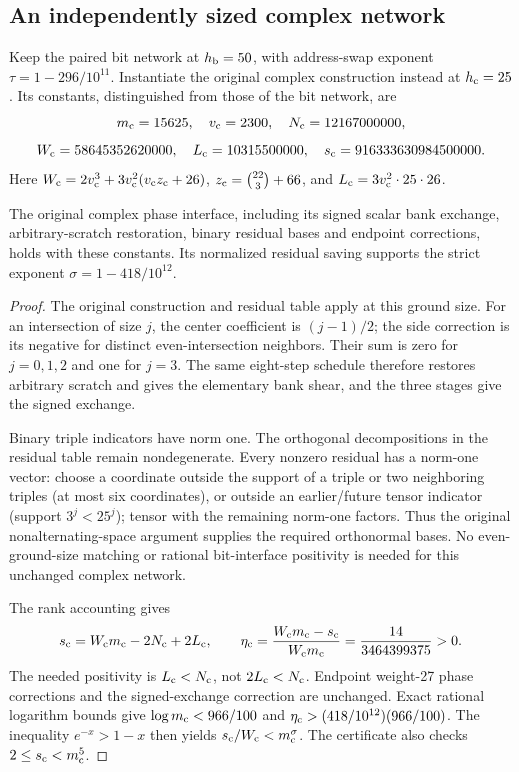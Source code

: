 \subsection{An independently sized complex network}
\label{sec:independent-complex}
Keep the paired bit network at $h_{\rm b}=50$, with address-swap exponent
$\tau=1-296/10^{11}$. Instantiate the original complex construction instead
at $h_{\rm c}=25$. Its constants, distinguished from those of the bit
network, are
\[
 m_{\rm c}=15625,\quad v_{\rm c}=2300,\quad N_{\rm c}=12167000000,
\]
\[
 W_{\rm c}=58645352620000,\quad L_{\rm c}=10315500000,\quad
 s_{\rm c}=916333630984500000.
\]
Here $W_{\rm c}=2v_{\rm c}^3+3v_{\rm c}^2(v_{\rm c}z_{\rm c}+26)$,
$z_{\rm c}=\binom{22}{3}+66$, and $L_{\rm c}=3v_{\rm c}^2\cdot25\cdot26$.

\begin{proposition}\label{prop:compact-complex-interface}
The original complex phase interface, including its signed scalar bank
exchange, arbitrary-scratch restoration, binary residual bases and endpoint
corrections, holds with these constants. Its normalized residual saving
supports the strict exponent $\sigma=1-418/10^{12}$.
\end{proposition}
\begin{proof}
The original construction and residual table apply at this ground size.
For an intersection of size $j$, the center coefficient is $(j-1)/2$; the
side correction is its negative for distinct even-intersection neighbors.
Their sum is zero for $j=0,1,2$ and one for $j=3$. The same eight-step
schedule therefore restores arbitrary scratch and gives the elementary bank
shear, and the three stages give the signed exchange.

Binary triple indicators have norm one. The orthogonal decompositions in
the residual table remain nondegenerate. Every nonzero residual has a
norm-one vector: choose a coordinate outside the support of a triple or two
neighboring triples (at most six coordinates), or outside an earlier/future
tensor indicator (support $3^j<25^j$); tensor with the remaining norm-one
factors. Thus the original nonalternating-space argument supplies the required
orthonormal bases. No even-ground-size matching or rational bit-interface
positivity is needed for this unchanged complex network.

The rank accounting gives
\[
 s_{\rm c}=W_{\rm c}m_{\rm c}-2N_{\rm c}+2L_{\rm c},\qquad
 \eta_{\rm c}=\frac{W_{\rm c}m_{\rm c}-s_{\rm c}}{W_{\rm c}m_{\rm c}}
             =\frac{14}{3464399375}>0.
\]
The needed positivity is $L_{\rm c}<N_{\rm c}$, not
$2L_{\rm c}<N_{\rm c}$. Endpoint weight-27 phase corrections and the
signed-exchange correction are unchanged. Exact rational logarithm bounds
give $\log m_{\rm c}<966/100$ and
$\eta_{\rm c}>(418/10^{12})(966/100)$. The inequality
$e^{-x}>1-x$ then yields $s_{\rm c}/W_{\rm c}<m_{\rm c}^{\sigma}$.
The certificate also checks $2\le s_{\rm c}<m_{\rm c}^5$.
\end{proof}

